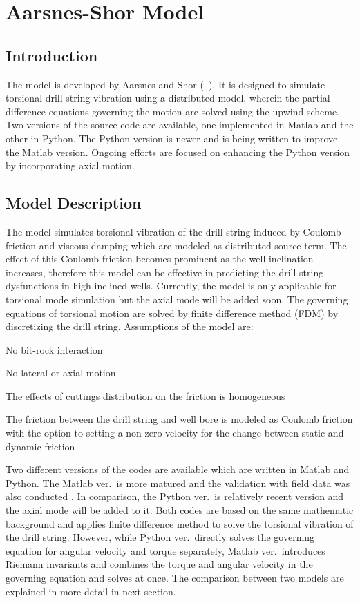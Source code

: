 \chapter{Aarsnes-Shor Model}
\label{ch:aarnessshormodel}

\section{Introduction}
The model is developed by Aarsnes and Shor (~\cite{ref:aarsnes2017a}). It is designed to simulate torsional drill string vibration using a distributed model, wherein the partial difference equations governing the motion are solved using the upwind scheme.   Two versions of the source code are available, one implemented in Matlab and the other in Python.  The Python version is newer and is being written to improve the Matlab version.  Ongoing efforts are focused on enhancing the Python version by incorporating axial motion.

\section{Model Description}
The model simulates torsional vibration of the drill string induced by Coulomb friction and viscous damping which are modeled as distributed source term. The effect of this Coulomb friction becomes prominent as the well inclination increases, therefore this model can be effective in predicting the drill string dysfunctions in high inclined wells. Currently, the model is only applicable for torsional mode simulation but the axial mode will be added soon. The governing equations of torsional motion are solved by finite difference method (FDM) by discretizing the drill string. Assumptions of the model are:
\begin{bulletedlist}
	\item No bit-rock interaction
	\item No lateral or axial motion
	\item The effects of cuttings distribution on the friction is homogeneous
    \item The friction between the drill string and well bore is modeled as Coulomb friction with the option to setting a non-zero velocity for the change between static and dynamic friction
\end{bulletedlist}

Two different versions of the codes are available which are written in Matlab and Python. The Matlab ver.\ is more matured and the validation with field data was also conducted \cite{ref:aarsnes2017a}. In comparison, the Python ver.\ is relatively recent version and the axial mode will be added to it. Both codes are based on the same mathematic background and applies finite difference method to solve the torsional vibration of the drill string. However, while Python ver.\ directly solves the governing equation for angular velocity and torque separately, Matlab ver.\ introduces Riemann invariants and combines the torque and angular velocity in the governing equation and solves at once. The comparison between two models are explained in more detail in next section.

